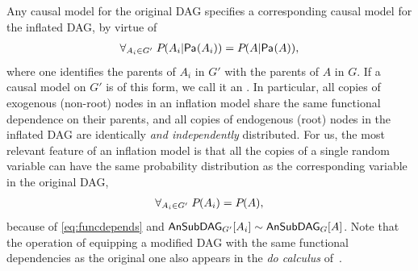 Any causal model for the original DAG specifies a corresponding causal model for the inflated DAG, by virtue of
\begin{align}\label{eq:funcdepends}
\forall_{A_i\in G'}\; \pdf{A_i|\Pa{A_i}}=\pdf{A|\Pa{A}},
\end{align}
where one identifies the parents of $A_i$ in $G'$ with the parents of $A$ in $G$. If a causal model on $G'$ is of this form, we call it an . In particular, all copies of exogenous (non-root) nodes in an inflation model share the same functional dependence on their parents, and all copies of endogenous (root) nodes in the inflated DAG are identically \emph{and independently} distributed. For us, the most relevant feature of an inflation model is that all the copies of a single random variable can have the same probability distribution as the corresponding variable in the original DAG,
\begin{align}\label{eq:singlevariatecoincidence}
\forall_{A_i\in G'}\; \pdf{A_i}=\pdf{A},
\end{align}
because of \cref{eq:funcdepends} and $\ansubgraph[G']{A_i}\sim\ansubgraph[G]{A}$. Note that the operation of equipping a modified DAG with the same functional dependencies as the original one also appears in the \emph{do calculus} of~\citet{pearl2009causality}. 

